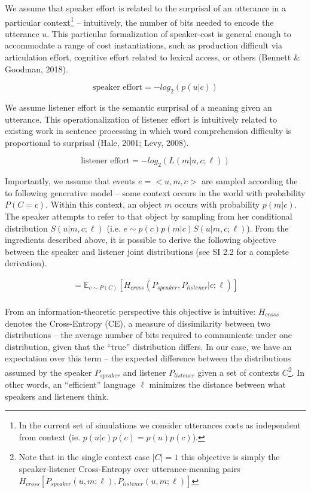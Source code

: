 \documentclass[10pt, letterpaper]{article}
\begin{document}
We assume that speaker effort is related to the surprisal of an
utterance in a particular
context\footnote{In the current set of simulations we consider utterances costs as independent from context (ie. $p(u|c)p(c)=p(u)p(c)$).}
-- intuitively, the number of bits needed to encode the utterance \(u\).
This particular formalization of speaker-cost is general enough to
accommodate a range of cost instantiations, such as production difficult
via articulation effort, cognitive effort related to lexical access, or
others (Bennett \& Goodman, 2018).\par

\[\text{speaker effort} = -log_2(p(u|c))\]

We assume listener effort is the semantic surprisal of a meaning given
an utterance. This operationalization of listener effort is intuitively
related to existing work in sentence processing in which word
comprehension difficulty is proportional to surprisal (Hale, 2001; Levy,
2008).

\[\text{listener effort} = -log_2(L(m|u, c; \ell))\]

Importantly, we assume that events \(e = <u, m, c>\) are sampled
according the to following generative model -- some context occurs in
the world with probability \(P(C=c)\). Within this context, an object
\(m\) occurs with probability \(p(m|c)\). The speaker attempts to refer
to that object by sampling from her conditional distribution
\(S(u|m, c; \ell)\) (i.e. \(e \sim p(c)p(m|c)S(u|m, c; \ell)\)). From
the ingredients described above, it is possible to derive the following
objective between the speaker and listener joint distributions (see SI
2.2 for a complete derivation).

\begin{equation}
\begin{split}
  = \mathbb{E}_{c \sim P(C)}[H_{cross}(P_{speaker}, P_{listener} | c; \ell)]\\
\end{split}
\end{equation}

From an information-theoretic perspective this objective is intuitive:
\(H_{cross}\) denotes the Cross-Entropy (CE), a measure of dissimilarity
between two distributions -- the average number of bits required to
communicate under one distribution, given that the ``true'' distribution
differs. In our case, we have an expectation over this term -- the
expected difference between the distributions assumed by the speaker
\(P_{speaker}\) and listener \(P_{listener}\) given a set of contexts
\(C\)\footnote{Note that in the single context case $|C|=1$ this objective is simply the speaker-listener Cross-Entropy over utterance-meaning pairs $H_{cross}[P_{speaker}(u, m; \ell), P_{listener}(u, m; \ell)]$}.
In other words, an ``efficient'' language \(\ell\) minimizes the
distance between what speakers and listeners think.
\end{document}
